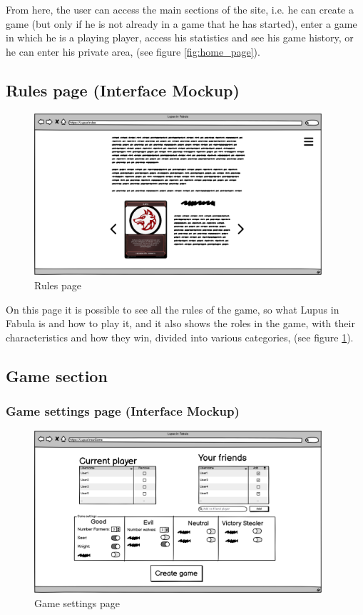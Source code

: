 From here, the user can access the main sections of the site, i.e. he can create a game (but only if he is not already in a game that he has started), enter a game in which he is a playing player, access his statistics and see his game history, or he can enter his private area, (see figure \ref{fig:home_page}).

\subsection{Rules page (Interface Mockup)}

\begin{figure}[htb] 
    \centering
    \includegraphics[height=6cm]{images/Page/Rules.png}
    \caption{Rules page}
    \label{fig:rules_page}
\end{figure}
On this page it is possible to see all the rules of the game,  so what Lupus in Fabula is and how to play it, and it also shows the roles in the game, with their characteristics and how they win, divided into various categories, (see figure \ref{fig:rules_page}).

\subsection{Game section}

\subsubsection{Game settings page (Interface Mockup)}
\begin{figure}[htb] 
    \centering
    \includegraphics[height=6cm]{images/Page/GameCration.png}
    \caption{Game settings page}
    \label{fig:GameCration_page}
\end{figure}

